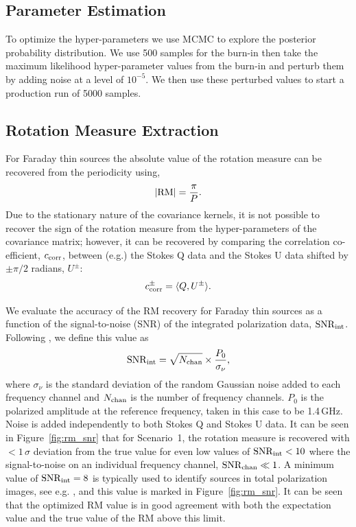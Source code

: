 \documentclass[fleqn,usenatbib]{mnras}
\begin{document}
\subsection{Parameter Estimation}
\label{sec:optimization}

To optimize the hyper-parameters we use MCMC to explore the posterior probability distribution. We use 500 samples for the burn-in then take the maximum likelihood hyper-parameter values from the burn-in and perturb them by adding noise at a level of $10^{-5}$. We then use these perturbed values to start a production run of 5000 samples.


\subsection{Rotation Measure Extraction}
\label{sec:rms}

For Faraday thin sources the absolute value of the rotation measure can be recovered from the periodicity using,
%
\begin{equation}
|{\rm RM}| = \frac{\pi}{P}.
\end{equation}
%
Due to the stationary nature of the covariance kernels, it is not possible to recover the sign of the rotation measure from the hyper-parameters of the covariance matrix; however, it can be recovered by comparing the correlation co-efficient, $c_{\rm corr}$, between (e.g.) the Stokes Q data and the Stokes U data shifted by $\pm\pi/2$ radians, $U^{\pm}$:
%
\begin{equation}
c_{\rm corr}^{\pm} = \langle Q,U^{\pm} \rangle.
\end{equation}

We evaluate the accuracy of the RM recovery for Faraday thin sources as a function of the signal-to-noise (SNR) of the integrated polarization data, ${\rm SNR}_{\rm int}$. Following \cite{2018arXiv180604326S}, we define this value as
%
\begin{equation}
{\rm SNR}_{\rm int} = \sqrt{N_{\rm chan}} \times \frac{P_0}{\sigma_{\nu}},
\end{equation}
%
where $\sigma_{\nu}$ is the standard deviation of the random Gaussian noise added to each frequency channel and $N_{\rm chan}$ is the number of frequency channels. $P_0$ is the polarized amplitude at the reference frequency, taken in this case to be 1.4\,GHz. Noise is added independently to both Stokes Q and Stokes U data. It can be seen in Figure~\ref{fig:rm_snr} that for Scenario~1, the rotation measure is recovered with $< 1\,\sigma$ deviation from the true value for even low values of ${\rm SNR}_{\rm int}<10$ where the signal-to-noise on an individual frequency channel, ${\rm SNR}_{\rm chan}\ll 1$. A minimum value of ${\rm SNR}_{\rm int}=8$ is typically used to identify sources in total polarization images, see e.g. \cite{george_stil_keller_2012}, and this value is marked in Figure~\ref{fig:rm_snr}. It can be seen that the optimized RM value is in good agreement with both the expectation value and the true value of the RM above this limit. 
\end{document}

